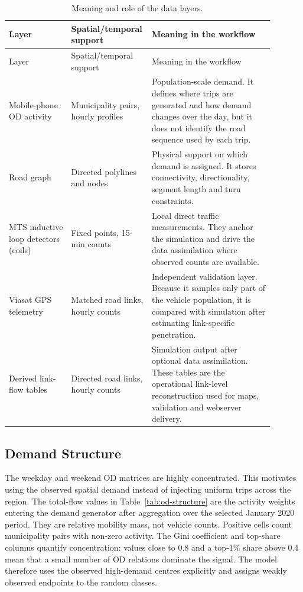 \documentclass[11pt,a4paper]{article}
\begin{document}
\begin{longtable}{@{}p{0.23\linewidth}p{0.21\linewidth}p{0.45\linewidth}@{}}
\caption{Meaning and role of the data layers.}
\label{tab:data-layers}\\
\toprule
Layer & Spatial/temporal support & Meaning in the workflow \\
\midrule
\endfirsthead
\toprule
Layer & Spatial/temporal support & Meaning in the workflow \\
\midrule
\endhead
\bottomrule
\endfoot
Mobile-phone OD activity &
Municipality pairs, hourly profiles &
Population-scale demand. It defines where trips are generated and how demand
changes over the day, but it does not identify the road sequence used by each
trip. \\
Road graph &
Directed polylines and nodes &
Physical support on which demand is assigned. It stores connectivity,
directionality, segment length and turn constraints. \\
MTS inductive loop detectors (coils) &
Fixed points, 15-min counts &
Local direct traffic measurements. They anchor the simulation and drive the
data assimilation where observed counts are available. \\
Viasat GPS telemetry &
Matched road links, hourly counts &
Independent validation layer. Because it samples only part of the vehicle
population, it is compared with simulation after estimating link-specific
penetration. \\
Derived link-flow tables &
Directed road links, hourly counts &
Simulation output after optional data assimilation. These tables are the operational
link-level reconstruction used for maps, validation and webserver delivery. \\
\end{longtable}

\subsection{Demand Structure}

The weekday and weekend OD matrices are highly concentrated. This motivates using the observed spatial demand instead of injecting uniform trips across the region. The total-flow values in Table~\ref{tab:od-structure} are the activity weights entering the demand generator after aggregation over the selected January 2020 period. They are relative mobility mass, not vehicle counts. Positive cells count municipality pairs with non-zero activity. The Gini coefficient and top-share columns quantify concentration: values close to 0.8 and a top-1\% share above 0.4 mean that a small number of OD relations dominate the signal. The model therefore uses the observed high-demand centres explicitly and assigns weakly observed endpoints to the random classes.
\end{document}
